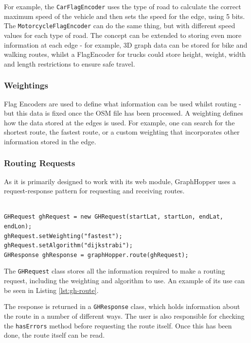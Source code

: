 \documentclass[ %
                    author={Alexander Hill},
                supervisor={Dr. Benjamin Sach},
                    degree={MEng},
                     title={MARMOSET},
                  subtitle={Multi-Agent Route Management using Online Simulation for Efficient Transportation},
                      type={research},
                      year={2016} ]{dissertation}
\begin{document}
For example, the \texttt{CarFlagEncoder} uses the type of road to calculate the
correct maximum speed of the vehicle and then sets the speed for the edge, using
5 bits. The \texttt{MotorcycleFlagEncoder} can do the same thing, but with
different speed values for each type of road. The concept can be extended to
storing even more information at each edge - for example, 3D graph data can be
stored for bike and walking routes, whilst a FlagEncoder for trucks could store
height, weight, width and length restrictions to ensure safe travel.

\subsubsection{Weightings}\label{sec:gh-weighting}

Flag Encoders are used to define what information can be used whilst routing -
but this data is fixed once the OSM file has been processed. A weighting defines
how the data stored at the edges is used. For example, one can search for the
shortest route, the fastest route, or a custom weighting that incorporates other
information stored in the edge.

\subsubsection{Routing Requests}

As it is primarily designed to work with its web module, GraphHopper uses a
request-response pattern for requesting and receiving routes.

\begin{lstlisting}[label=lst:gh-route,caption={GraphHopper request and response}]

GHRequest ghRequest = new GHRequest(startLat, startLon, endLat, endLon);
ghRequest.setWeighting("fastest");
ghRequest.setAlgorithm("dijkstrabi");
GHResponse ghResponse = graphHopper.route(ghRequest);

\end{lstlisting}

The \texttt{GHRequest} class stores all the information required to make a
routing request, including the weighting and algorithm to use. An example of its
use can be seen in Listing \ref{lst:gh-route}.

The response is returned in a \texttt{GHResponse} class, which holds information
about the route in a number of different ways. The user is also responsible for
checking the \texttt{hasErrors} method before requesting the route itself.  Once
this has been done, the route itself can be read.
\end{document}

